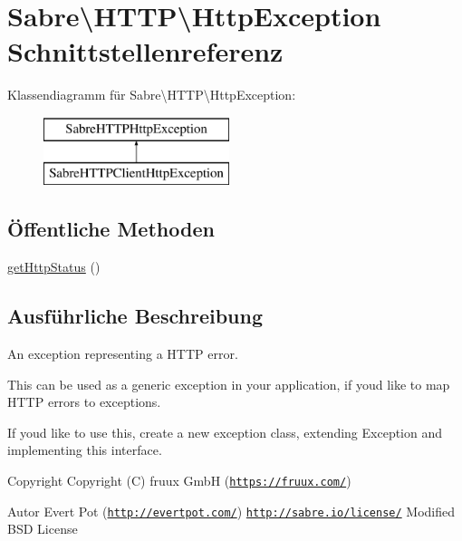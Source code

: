 \hypertarget{interface_sabre_1_1_h_t_t_p_1_1_http_exception}{}\section{Sabre\textbackslash{}H\+T\+TP\textbackslash{}Http\+Exception Schnittstellenreferenz}
\label{interface_sabre_1_1_h_t_t_p_1_1_http_exception}
Klassendiagramm für Sabre\textbackslash{}H\+T\+TP\textbackslash{}Http\+Exception\+:\begin{figure}[H]
\begin{center}
\leavevmode
\includegraphics[height=2.000000cm]{interface_sabre_1_1_h_t_t_p_1_1_http_exception}
\end{center}
\end{figure}
\subsection*{Öffentliche Methoden}
\begin{DoxyCompactItemize}
\item 
\mbox{\hyperlink{interface_sabre_1_1_h_t_t_p_1_1_http_exception_a3f276c42a877c12d0fe55b644e9dad73}{get\+Http\+Status}} ()
\end{DoxyCompactItemize}


\subsection{Ausführliche Beschreibung}
An exception representing a H\+T\+TP error.

This can be used as a generic exception in your application, if you\textquotesingle{}d like to map H\+T\+TP errors to exceptions.

If you\textquotesingle{}d like to use this, create a new exception class, extending Exception and implementing this interface.

\begin{DoxyCopyright}{Copyright}
Copyright (C) fruux GmbH (\href{https://fruux.com/}{\tt https\+://fruux.\+com/}) 
\end{DoxyCopyright}
\begin{DoxyAuthor}{Autor}
Evert Pot (\href{http://evertpot.com/}{\tt http\+://evertpot.\+com/})  \href{http://sabre.io/license/}{\tt http\+://sabre.\+io/license/} Modified B\+SD License 
\end{DoxyAuthor}


